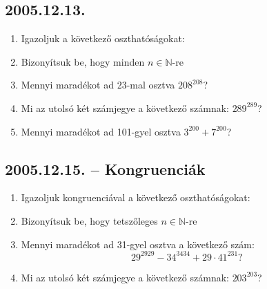 \subsection*{2005.12.13.}
\begin{enumerate}
 
\item Igazoljuk a következő oszthatóságokat:


\item Bizonyítsuk be, hogy minden $n\in \mathbb{N}$-re


\item Mennyi maradékot ad 23-mal osztva $208^{208}$?

\item Mi az utolsó két számjegye a következő számnak: 
$289^{289}$?

\item Mennyi maradékot ad 101-gyel osztva $3^{200}+7^{200}$?

\end{enumerate}

\subsection*{2005.12.15. -- Kongruenciák}
\begin{enumerate}
\item Igazoljuk kongruenciával a következő oszthatóságokat:
\item Bizonyítsuk be, hogy tetszőleges $n\in\mathbb{N}$-re
\item Mennyi maradékot ad 31-gyel osztva a következő szám:
$$29^{2929}-34^{3434}+29\cdot 41^{231}?$$
\item Mi az utolsó két számjegye a következő számnak: $203^{203}$?
\end{enumerate}

